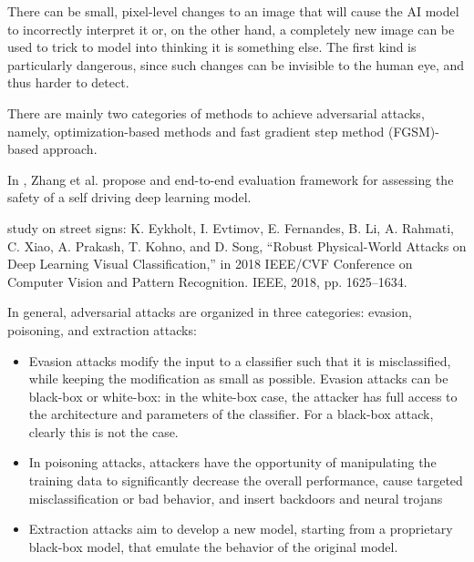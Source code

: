 There can be small, pixel-level changes to an image that will cause the AI model to incorrectly interpret it or, on the other hand, a completely new image can be used to trick to model into thinking it is something else. The first kind is particularly dangerous, since such changes can be invisible to the human eye, and thus harder to detect.

There are mainly two categories of methods to achieve adversarial attacks, namely, optimization-based methods and fast gradient step method (FGSM)-based approach.


In \cite{DBLP:journals/iotj/ZhangLWWLJ22}, Zhang et al. propose and end-to-end evaluation framework for assessing the safety of a self driving deep learning model.



study on street signs: K. Eykholt, I. Evtimov, E. Fernandes, B. Li, A. Rahmati, C. Xiao,
A. Prakash, T. Kohno, and D. Song, “Robust Physical-World Attacks on
Deep Learning Visual Classification,” in 2018 IEEE/CVF Conference on
Computer Vision and Pattern Recognition. IEEE, 2018, pp. 1625–1634.


In general, adversarial attacks are organized in three categories: evasion, poisoning, and extraction attacks:
\begin{itemize}
    \item Evasion attacks modify the input to a classifier such that it is misclassified, while keeping the modification as small as possible. Evasion attacks can be black-box or white-box: in the white-box case, the attacker has full access to the architecture and parameters of the classifier. For a black-box attack, clearly this is not the case.
    \item In poisoning attacks, attackers have the opportunity of manipulating the training data to significantly decrease the overall performance, cause targeted misclassification or bad behavior, and insert backdoors and neural trojans
    \item Extraction attacks aim to develop a new model, starting from a proprietary black-box model, that emulate the behavior of the original model.
\end{itemize}

